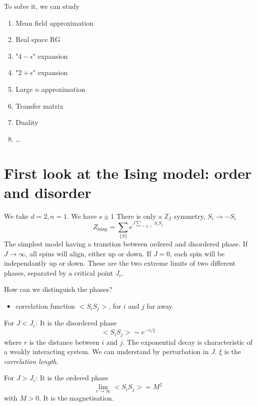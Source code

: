 \documentclass[a4paper]{book}
\theoremstyle{definition}
\theoremstyle{remark}
\begin{document}
To solve it, we can study 
\begin{enumerate}
    \item Mean field approximation 
    \item Real space RG
    \item "$4-\epsilon$" expansion
    \item "$2+\epsilon$" expansion
    \item Large $n$ approximation 
    \item Transfer matrix 
    \item Duality
    \item \dots
\end{enumerate}

\section{First look at the Ising model: order and disorder}

We take $d=2, n = 1$. We have $s \pm 1$\newline 
There is only a $\mathbb{Z}_2$ symmetry, $S_i \rightarrow -S_i$
\begin{equation}
    Z_{\text{ising}} = \sum_{\{S\}}e^{J\sum_{<ij>}S_i S_j}
\end{equation}
The simplest model having a transtion between ordered and disordered phase. If $J\rightarrow \infty$, all spins will align, either up or down. If $J = 0$, each spin will be independantly up or down. These are the two extreme limits of two different phases, separated by a critical point $J_c$. \par \medskip 

How can we distinguish the phases? 
\begin{itemize}
    \item correlation function $<S_i S_j>$, for $i$ and $j$ far away.
\end{itemize}


For \underline{$J < J_c$}: \newline
It is the disordered phase
\begin{equation}
    <S_i S_j> \sim e^{-r/\xi}
\end{equation}
where $r$ is the distance between $i$ and $j$. \newline 
The exponential decay is characteristic of a weakly interacting system. \newline 
We can understand by perturbation in $J$.\newline 
$\xi$ is the \textit{correlation length}.\par \medskip 
For \underline{$J > J_c$}: \newline
It is the ordered phase
\begin{equation}
    \lim_{r \rightarrow \infty} <S_iS_j> = M^2
\end{equation}
with $M>0$. It is the magnetisation. \bigskip 
\end{document}
